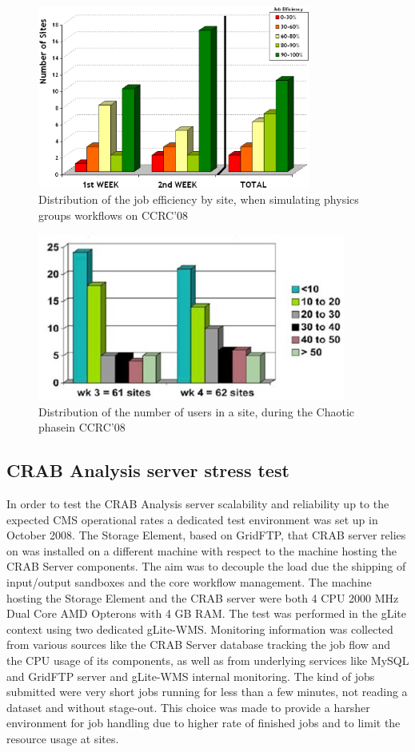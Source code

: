 \begin{figure}
\centering
\includegraphics[width=0.80\textwidth]{CCRC08SiteEff.eps}
\caption{Distribution of the job efficiency by site, when simulating physics
groups workflows on CCRC’08}
\label{fig:CCRC08SiteEff}
\end{figure}
\begin{figure}
\centering
\includegraphics[width=0.90\textwidth]{CCRC08Chaotic.eps}
\caption{Distribution of the number of users in a site, during the Chaotic phasein CCRC’08}
\label{fig:CCRC08Chaotic}
\end{figure}

\subsection{CRAB Analysis server stress test}
In order to test the CRAB Analysis server scalability and reliability up to
the expected CMS operational rates a dedicated test environment was
set up in October 2008. The Storage Element, based on GridFTP, 
that CRAB server relies on was installed on a different machine with 
respect to the machine hosting the CRAB Server components. The aim was 
to decouple the load
due the shipping of input/output sandboxes and the core workflow
management. The machine hosting the Storage Element and the CRAB
server were both 4 CPU 2000 MHz Dual Core AMD Opterons with 4 GB
RAM. The test was performed in the gLite context using two dedicated
gLite-WMS. Monitoring information was collected from various sources
like the CRAB Server database tracking the job flow and the CPU usage
of its components, as well as from underlying services like MySQL and
GridFTP server and gLite-WMS internal monitoring. The kind of
jobs submitted were very short jobs running for less than a few
minutes, not reading a dataset and without stage-out. This choice was
made to provide a harsher environment for job handling due to higher
rate of finished jobs and to limit the resource usage at sites.

